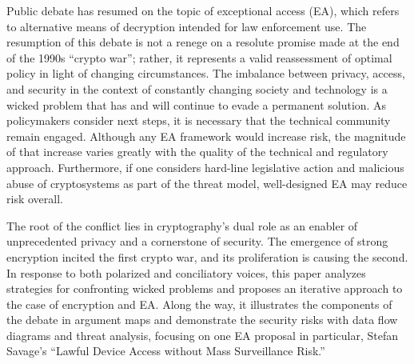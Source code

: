 
\parboxindent Public debate has resumed on the topic of exceptional access (EA), which refers to alternative means of
decryption intended for law enforcement use. The resumption of this debate is not a renege on a resolute promise made at
the end of the 1990s ``crypto war''; rather, it represents a valid reassessment of optimal policy in light of changing
circumstances. The imbalance between privacy, access, and security in the context of constantly changing society and
technology is a wicked problem that has and will continue to evade a permanent solution. As policymakers consider next
steps, it is necessary that the technical community remain engaged. Although any EA framework would increase risk, the
magnitude of that increase varies greatly with the quality of the technical and regulatory approach. Furthermore, if one
considers hard-line legislative action and malicious abuse of cryptosystems as part of the threat model, well-designed
EA may reduce risk overall.

\parboxindent The root of the conflict lies in cryptography's dual role as an enabler of unprecedented privacy and a
cornerstone of security. The emergence of strong encryption incited the first crypto war, and its proliferation is
causing the second. In response to both polarized and conciliatory voices, this paper analyzes strategies for
confronting wicked problems and proposes an iterative approach to the case of encryption and EA. Along the way, it
illustrates the components of the debate in argument maps and demonstrate the security risks with data flow diagrams and
threat analysis, focusing on one EA proposal in particular, Stefan Savage's ``Lawful Device Access without Mass
Surveillance Risk.''
